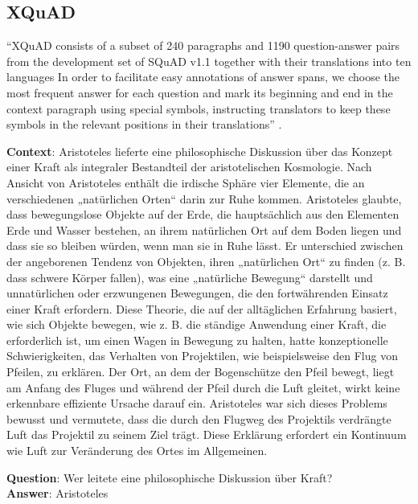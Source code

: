 \subsection{XQuAD}

``XQuAD consists of a subset of 240 paragraphs and 1190 question-answer pairs from the development
set of SQuAD v1.1 together with their translations into ten languages \textelp{} In order to
facilitate easy annotations of answer spans, we choose the most frequent answer for each question
and mark its beginning and end in the context paragraph using special symbols, instructing
translators to keep these symbols in the relevant positions in their translations''
\cite{artetxe2019cross}.

\begin{examples}
  \label{ex:xquad}
  \item \textbf{Context}:
        Aristoteles lieferte eine philosophische Diskussion über das Konzept einer Kraft
        als integraler Bestandteil der aristotelischen Kosmologie. Nach Ansicht von Aristoteles enthält
        die irdische Sphäre vier Elemente, die an verschiedenen „natürlichen Orten“ darin zur Ruhe
        kommen. Aristoteles glaubte, dass bewegungslose Objekte auf der Erde, die hauptsächlich aus den
        Elementen Erde und Wasser bestehen, an ihrem natürlichen Ort auf dem Boden liegen und dass sie so
        bleiben würden, wenn man sie in Ruhe lässt. Er unterschied zwischen der angeborenen Tendenz von
        Objekten, ihren „natürlichen Ort“ zu finden (z. B. dass schwere Körper fallen), was eine
        „natürliche Bewegung“ darstellt und unnatürlichen oder erzwungenen Bewegungen, die den
        fortwährenden Einsatz einer Kraft erfordern. Diese Theorie, die auf der alltäglichen Erfahrung
        basiert, wie sich Objekte bewegen, wie z. B. die ständige Anwendung einer Kraft, die erforderlich
        ist, um einen Wagen in Bewegung zu halten, hatte konzeptionelle Schwierigkeiten, das Verhalten von
        Projektilen, wie beispielsweise den Flug von Pfeilen, zu erklären. Der Ort, an dem der
        Bogenschütze den Pfeil bewegt, liegt am Anfang des Fluges und während der Pfeil durch die Luft
        gleitet, wirkt keine erkennbare effiziente Ursache darauf ein. Aristoteles war sich dieses
        Problems bewusst und vermutete, dass die durch den Flugweg des Projektils verdrängte Luft das
        Projektil zu seinem Ziel trägt. Diese Erklärung erfordert ein Kontinuum wie Luft zur
        Veränderung des Ortes im Allgemeinen.

        \textbf{Question}: Wer leitete eine philosophische Diskussion über Kraft?\\
        \textbf{Answer}: Aristoteles


\end{examples}
